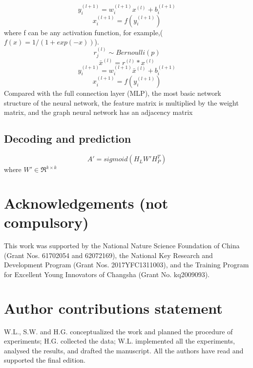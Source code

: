 \documentclass[fleqn,10pt]{wlscirep}
\begin{document}
\begin{equation}
y_i^{(l + 1)} = w_i^{(l + 1)}{x^{(l)}} + b_i^{(l + 1)}
\end{equation}
\begin{equation}
x_i^{(l + 1)} = f(y_i^{(l + 1)})
\end{equation}
where f can be any activation function, for example,($f(x) = 1/(1+exp(-x))$).
\begin{equation}
r_j^{(l)} \sim Bernoulli(p)
\end{equation}
\begin{equation}
{\bar x^{(l)}} = {r^{(l)}}*{x^{(l)}}
\end{equation}
\begin{equation}
y_i^{(l + 1)} = w_i^{(l + 1)}{\bar x^{(l)}} + b_i^{(l + 1)}
\end{equation}
\begin{equation}
x_i^{(l + 1)} = f(y_i^{(l + 1)})
\end{equation}
Compared with the full connection layer (MLP), the most basic network structure of the neural network, the feature matrix is multiplied by the weight matrix, and the graph neural network has an adjacency matrix

\subsection*{Decoding and prediction}

\begin{equation}
A' = sigmoid({H_L}W'H_P^T)
\end{equation}
where $W' \in {\Re ^{k \times k}}$




\section*{Acknowledgements (not compulsory)}
This work was supported by the National Nature Science Foundation of China (Grant Nos. 61702054 and 62072169), the National Key Research and Development Program (Grant Nos. 2017YFC1311003), and the Training Program for Excellent Young Innovators of Changsha (Grant No. kq2009093).

\section*{Author contributions statement}
W.L., S.W. and H.G. conceptualized the work and planned the procedure of experiments; H.G. collected the data; W.L. implemented all the experiments, analysed the results, and drafted the manuscript. All the authors have read and supported the final edition. 
\end{document}
